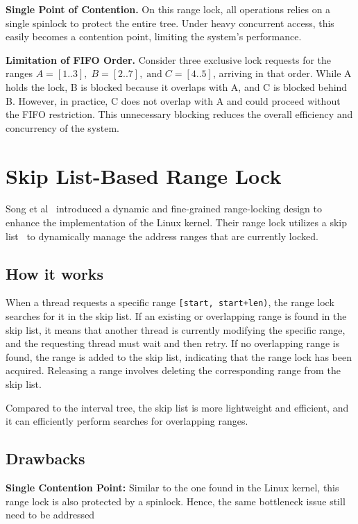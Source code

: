 \textbf{Single Point of Contention.}
On this range lock, all operations relies on a single spinlock to protect the entire tree. Under heavy concurrent access, this easily becomes a contention point, limiting the system's performance.
    
\textbf{Limitation of FIFO Order.} 
Consider three exclusive lock requests for the ranges \( A = [1..3], \; B = [2..7], \; \text{and} \; C = [4..5] \), arriving in that order. While A holds the lock, B is blocked because it overlaps with A, and C is blocked behind B. However, in practice, C does not overlap with A and could proceed without the FIFO restriction. This unnecessary blocking reduces the overall efficiency and concurrency of the system.

\section{Skip List-Based Range Lock}

Song et al~\parencite{song2013parallelizing} introduced a dynamic and fine-grained range-locking design to enhance the implementation of the Linux kernel. Their range lock utilizes a skip list~\parencite{pugh1990skip} to dynamically manage the address ranges that are currently locked.

\subsection*{How it works}

When a thread requests a specific range \texttt{[start, start+len)}, the range lock searches for it in the skip list. If an existing or overlapping range is found in the skip list, it means that another thread is currently modifying the specific range, and the requesting thread must wait and then retry. If no overlapping range is found, the range is added to the skip list, indicating that the range lock has been acquired. Releasing a range involves deleting the corresponding range from the skip list.

Compared to the interval tree, the skip list is more lightweight and efficient, and it can efficiently perform searches for overlapping ranges.

\subsection*{Drawbacks}

\textbf{Single Contention Point:} 
Similar to the one found in the Linux kernel, this range lock is also protected by a spinlock. Hence, the same bottleneck issue still need to be addressed  

